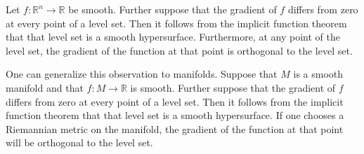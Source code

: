 \documentclass[12pt]{article}
\begin{document}
Let $f: \mathbb{R}^n \to \mathbb{R}$ be smooth.  Further suppose that the gradient of $f$ differs from zero at every point of a level set.  Then it follows from the implicit function theorem that that level set is a smooth hypersurface.  Furthermore, at any point of the level set, the gradient of the function at that point is orthogonal to the level set.  

One can generalize this observation to manifolds.  Suppose that $M$ is a smooth manifold and that $f: M \to \mathbb{R}$ is smooth.  Further suppose that the gradient of $f$ differs from zero at every point of a level set.  Then it follows from the implicit function theorem that that level set is a smooth hypersurface.  If one chooses a Riemannian metric on the manifold, the gradient of the function at that point will be orthogonal to the level set.
\end{document}
